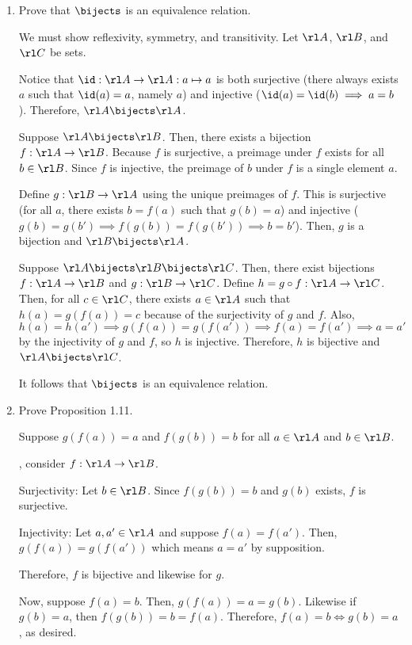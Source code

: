 \begin{xca}\end{xca}
\begin{enumerate}
  \item Prove that $\bijects$ is an equivalence relation.
        \begin{prf}
          We must show reflexivity, symmetry, and transitivity.
          Let $\rl A$, $\rl B$, and $\rl C$ be sets.

          Notice that $\id : \rl A \to \rl A : a \mapsto a$
          is both surjective (there always exists $a$ such that $\id(a) = a$, namely $a$)
          and injective ($\id(a) = \id(b) \implies a = b$).
          Therefore, $\rl A \bijects \rl A$.

          Suppose $\rl A \bijects \rl B$.
          Then, there exists a bijection $f : \rl A \to \rl B$.
          Because $f$ is surjective, a preimage under $f$ exists for all $b \in \rl B$.
          Since $f$ is injective, the preimage of $b$ under $f$ is a single element $a$.

          Define $g : \rl B \to \rl A$ using the unique preimages of $f$.
          This is surjective (for all $a$, there exists $b = f(a)$ such that $g(b) = a$)
          and injective ($g(b) = g(b') \implies f(g(b)) = f(g(b')) \implies b = b'$).
          Then, $g$ is a bijection and $\rl B \bijects \rl A$.

          Suppose $\rl A \bijects \rl B \bijects \rl C$.
          Then, there exist bijections $f : \rl A \to \rl B$ and $g : \rl B \to \rl C$.
          Define $h = g \circ f : \rl A \to \rl C$.
          Then, for all $c \in \rl C$, there exists $a \in \rl A$
          such that $h(a) = g(f(a)) = c$ because of the surjectivity of $g$ and $f$.
          Also, $h(a) = h(a') \implies g(f(a)) = g(f(a')) \implies f(a) = f(a') \implies a = a'$
          by the injectivity of $g$ and $f$, so $h$ is injective.
          Therefore, $h$ is bijective and $\rl A \bijects \rl C$.

          It follows that $\bijects$ is an equivalence relation.
        \end{prf}
  \item Prove Proposition 1.11.
        \begin{prf}
          Suppose $g(f(a)) = a$ and $f(g(b)) = b$ for all $a \in \rl A$ and $b \in \rl B$.

          \WLOG, consider $f : \rl A \to \rl B$.

          Surjectivity: Let $b \in \rl B$.
          Since $f(g(b)) = b$ and $g(b)$ exists, $f$ is surjective.

          Injectivity: Let $a, a' \in \rl A$ and suppose $f(a) = f(a')$.
          Then, $g(f(a)) = g(f(a'))$ which means $a = a'$ by supposition.

          Therefore, $f$ is bijective and likewise for $g$.

          Now, suppose $f(a) = b$. Then, $g(f(a)) = a = g(b)$.
          Likewise if $g(b) = a$, then $f(g(b)) = b = f(a)$.
          Therefore, $f(a) = b \iff g(b) = a$, as desired.
        \end{prf}
\end{enumerate}

